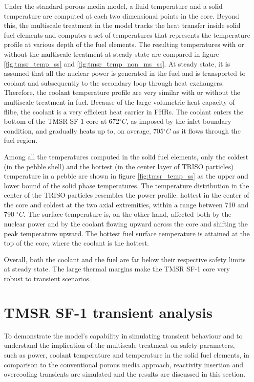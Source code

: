 \documentclass{elsarticle}
\begin{document}
Under the standard porous media model, a fluid temperature and a solid temperature are computed at each two dimensional points in the core. Beyond this, the multiscale treatment in the model tracks the heat transfer inside solid fuel elements and computes a set of temperatures that represents the temperature profile at various depth of the fuel elements. The resulting temperatures with or without the multiscale treatment at steady state are compared in figure \ref{fig:tmsr_temp_ss} and \ref{fig:tmsr_temp_non_ms_ss}.
At steady state, it is assumed that all the nuclear power is generated in the fuel and is transported to coolant and subsequently to the secondary loop through heat exchangers. Therefore, the coolant temperature profile are very similar with or without the multiscale treatment in fuel. 
Because of the large volumetric heat capacity of flibe, the coolant is a very efficient heat carrier in FHRs.
The coolant enters the bottom of the TMSR SF-1 core at 672$^{\circ}C$, as imposed by the inlet boundary condition, and gradually heats up to, on average, 705$^{\circ}C$ as it flows through the fuel region.

Among all the temperatures computed in the solid fuel elements, only the coldest (in the pebble shell) and the hottest (in the center layer of TRISO particles) temperature in a pebble are shown in figure \ref{fig:tmsr_temp_ss} as the upper and lower bound of the solid phase temperatures. The temperature distribution in the center of the TRISO particles resembles the power profile: hottest in the center of the core and coldest at the two axial extremities, within a range between 710 and 790 $^{\circ}C$. 
The surface temperature is, on the other hand, affected both by the nuclear power and by the coolant flowing upward across the core and shifting the peak temperature upward. The hottest fuel surface temperature is attained at the top of the core, where the coolant is the hottest. 


Overall, both the coolant and the fuel are far below their respective safety limits at steady state. The large thermal margins make the TMSR SF-1 core very robust to transient scenarios. 





\section{TMSR SF-1 transient analysis}
\label{sec:TMSR_transients}

To demonstrate the model's capability in simulating transient behaviour and to understand the implication of the multiscale treatment on safety parameters, such as power, coolant temperature and temperature in the solid fuel elements, in comparison to the conventional porous media approach, reactivity insertion and overcooling transients are simulated and the results are discussed in this section. 
\end{document}
